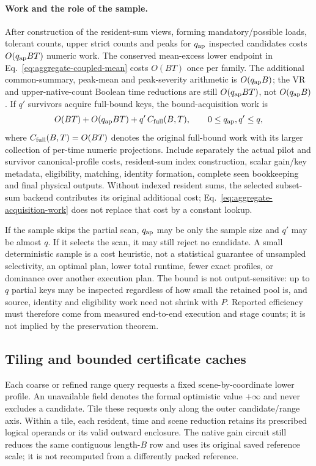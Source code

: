 \documentclass[11pt]{article}
\begin{document}
\paragraph{Work and the role of the sample.}
After construction of the resident-sum views, forming mandatory/possible loads, tolerant counts, upper strict counts and peaks for $q_{\rm ap}$ inspected candidates costs $O(q_{\rm ap}BT)$ numeric work. The conserved mean-excess lower endpoint in Eq.~\eqref{eq:aggregate-coupled-mean} costs $O(BT)$ once per family. The additional common-summary, peak-mean and peak-severity arithmetic is $O(q_{\rm ap}B)$; the VR and upper-native-count Boolean time reductions are still $O(q_{\rm ap}BT)$, not $O(q_{\rm ap}B)$. If $q'$ survivors acquire full-bound keys, the bound-acquisition work is
\begin{equation}
O(BT)+O(q_{\rm ap}BT)+q'\,C_{\rm full}(B,T),\qquad 0\le q_{\rm ap},q'\le q,
\label{eq:aggregate-acquisition-work}
\end{equation}
where $C_{\rm full}(B,T)=O(BT)$ denotes the original full-bound work with its larger collection of per-time numeric projections. Include separately the actual pilot and survivor canonical-profile costs, resident-sum index construction, scalar gain/key metadata, eligibility, matching, identity formation, complete seen bookkeeping and final physical outputs. Without indexed resident sums, the selected subset-sum backend contributes its original additional cost; Eq.~\eqref{eq:aggregate-acquisition-work} does not replace that cost by a constant lookup.

If the sample skips the partial scan, $q_{\rm ap}$ may be only the sample size and $q'$ may be almost $q$. If it selects the scan, it may still reject no candidate. A small deterministic sample is a cost heuristic, not a statistical guarantee of unsampled selectivity, an optimal plan, lower total runtime, fewer exact profiles, or dominance over another execution plan. The bound is not output-sensitive: up to $q$ partial keys may be inspected regardless of how small the retained pool is, and source, identity and eligibility work need not shrink with $P$. Reported efficiency must therefore come from measured end-to-end execution and stage counts; it is not implied by the preservation theorem.


\subsection{Tiling and bounded certificate caches}\label{sec:certificate-tiling}
Each coarse or refined range query requests a fixed scene-by-coordinate lower profile. An unavailable field denotes the formal optimistic value $+\infty$ and never excludes a candidate. Tile these requests only along the outer candidate/range axis. Within a tile, each resident, time and scene reduction retains its prescribed logical operands or its valid outward enclosure. The native gain circuit still reduces the same contiguous length-$B$ row and uses its original saved reference scale; it is not recomputed from a differently packed reference.
\end{document}

